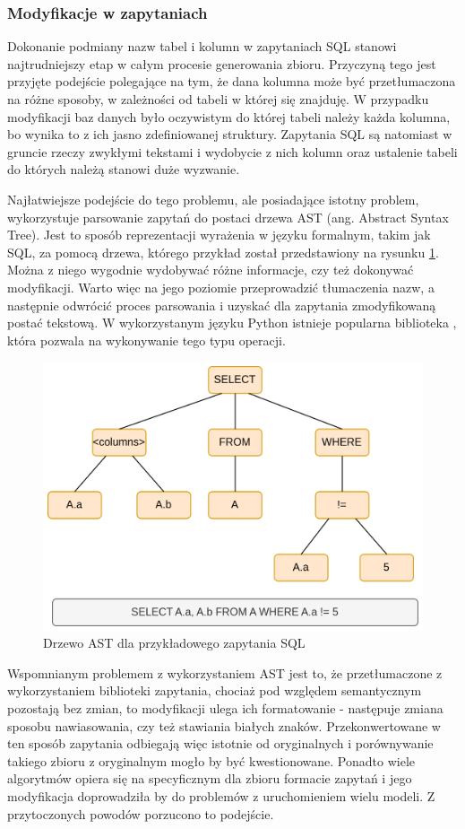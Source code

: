 \subsubsection{Modyfikacje w zapytaniach}
Dokonanie podmiany nazw tabel i kolumn w zapytaniach SQL stanowi najtrudniejszy etap w całym procesie generowania zbioru. Przyczyną tego jest przyjęte podejście polegające na tym, że dana kolumna może być przetłumaczona na różne sposoby, w zależności od tabeli w której się znajduję. W przypadku modyfikacji baz danych było oczywistym do której tabeli należy każda kolumna, bo wynika to z ich jasno zdefiniowanej struktury. Zapytania SQL są natomiast w gruncie rzeczy zwykłymi tekstami i wydobycie z nich kolumn oraz ustalenie tabeli do których należą stanowi duże wyzwanie.

Najłatwiejsze podejście do tego problemu, ale posiadające istotny problem, wykorzystuje parsowanie zapytań do postaci drzewa AST (ang. Abstract Syntax Tree). Jest to sposób reprezentacji wyrażenia w języku formalnym, takim jak SQL, za pomocą drzewa, którego przykład został przedstawiony na rysunku \ref{fig:ast-example}. Można z niego wygodnie wydobywać różne informacje, czy też dokonywać modyfikacji. Warto więc na jego poziomie przeprowadzić tłumaczenia nazw, a następnie odwrócić proces parsowania i uzyskać dla zapytania zmodyfikowaną postać tekstową. W wykorzystanym języku Python istnieje popularna biblioteka , która pozwala na wykonywanie tego typu operacji. 

\begin{figure}[ht!]
  \centering
  \includegraphics[width=0.6\linewidth]{images/ast_example.png}
  \caption{Drzewo AST dla przykładowego zapytania SQL}
  \label{fig:ast-example}
\end{figure}

Wspomnianym problemem z wykorzystaniem AST jest to, że przetłumaczone z wykorzystaniem biblioteki  zapytania, chociaż pod względem semantycznym pozostają bez zmian, to modyfikacji ulega ich formatowanie - następuje zmiana sposobu nawiasowania, czy też stawiania białych znaków. Przekonwertowane w ten sposób zapytania odbiegają więc istotnie od oryginalnych i porównywanie takiego zbioru z oryginalnym  mogło by być kwestionowane. Ponadto wiele algorytmów opiera się na specyficznym dla zbioru  formacie zapytań i jego modyfikacja doprowadziła by do problemów z uruchomieniem wielu modeli. Z przytoczonych powodów porzucono to podejście.

